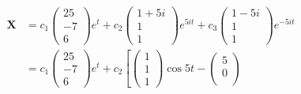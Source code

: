 \documentclass{article}
\begin{document}
\setcounter{subsubsection}{46}
\subsubsection{}

\begin{align*}
  \mathbf{X} & = c_1 \begin{pmatrix}
                       25 \\
                       -7 \\
                       6
                     \end{pmatrix} e^t + c_2 \begin{pmatrix}
                                               1 + 5 i \\
                                               1       \\
                                               1
                                             \end{pmatrix} e^{5 i t} + c_3 \begin{pmatrix}
                                                                             1 - 5 i \\
                                                                             1       \\
                                                                             1
                                                                           \end{pmatrix} e^{-5 i t}         \\
             & = c_1 \begin{pmatrix}
                       25 \\
                       -7 \\
                       6
                     \end{pmatrix} e^t + c_2 \left[ \begin{pmatrix}
                                                        1 \\
                                                        1 \\
                                                        1
                                                      \end{pmatrix} \cos 5 t - \begin{pmatrix}
                                                                                 5 \\
                                                                                 0 \\

\end{pmatrix}
\end{align*}
\end{document}

